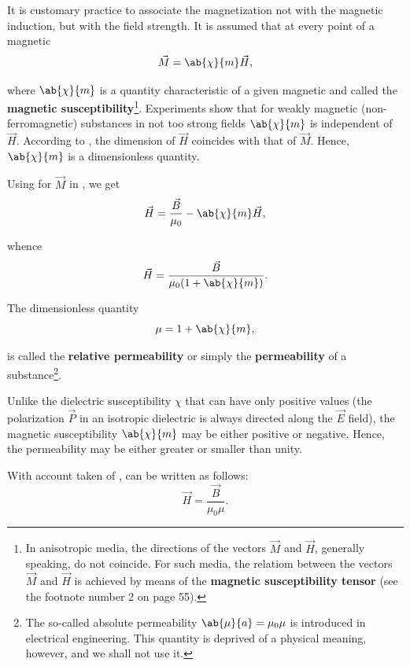 It is customary practice to associate the magnetization not with the magnetic induction, but with the field strength.
It is assumed that at every point of a magnetic
\begin{equation}\label{eq:7_14}
    \vec{M} = \ab{\chi}{m} \vec{H},
\end{equation}

\noindent
where $\ab{\chi}{m}$ is a quantity characteristic of a given magnetic and called the \textbf{magnetic susceptibility}\footnote{In anisotropic media, the directions of the vectors $\vec{M}$ and $\vec{H}$, generally speaking, do not coincide. For such media, the relatiom between the vectors $\vec{M}$ and $\vec{H}$ is achieved by means of the \textbf{magnetic susceptibility tensor} (see the footnote number 2 on page 55).}.
Experiments show that for weakly magnetic (non-ferromagnetic) substances in not too strong fields
$\ab{\chi}{m}$ is independent of $\vec{H}$.
According to , the dimension of $\vec{H}$ coincides with that of $\vec{M}$.
Hence, $\ab{\chi}{m}$ is a dimensionless quantity.

Using  for $\vec{M}$ in , we get
\begin{equation*}
    \vec{H} = \frac{\vec{B}}{\mu_0} - \ab{\chi}{m} \vec{H},
\end{equation*}

\noindent
whence
\begin{equation}\label{eq:7_15}
    \vec{H} = \frac{\vec{B}}{\mu_0 (1 + \ab{\chi}{m})}.
\end{equation}

The dimensionless quantity
\begin{equation}\label{eq:7_16}
    \mu = 1 + \ab{\chi}{m},
\end{equation}

\noindent
is called the \textbf{relative permeability} or simply the \textbf{permeability} of a substance\footnote{The so-called absolute permeability $\ab{\mu}{a}=\mu_0\mu$ is introduced in electrical engineering. This quantity is deprived of a physical meaning, however, and we shall not use it.}.

Unlike the dielectric susceptibility $\chi$ that can have only positive values (the polarization $\vec{P}$ in an isotropic dielectric is always directed along the $\vec{E}$ field), the magnetic susceptibility $\ab{\chi}{m}$ may be either positive or negative.
Hence, the permeability may be either greater or smaller than unity.

With account taken of ,  can be written as follows:
\begin{equation}\label{eq:7_17}
    \vec{H} = \frac{\vec{B}}{\mu_0\mu}.
\end{equation}

